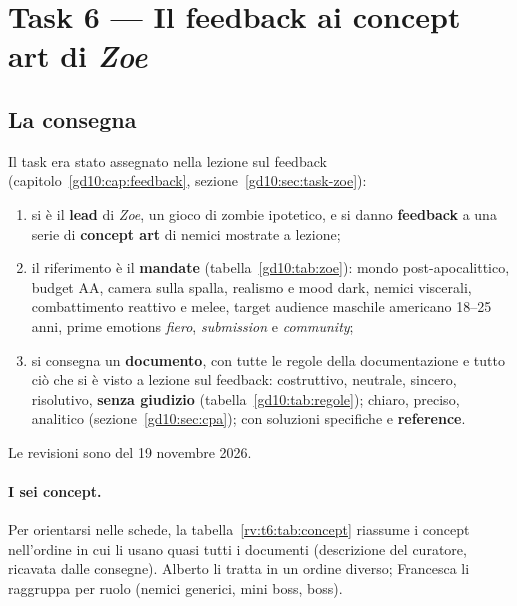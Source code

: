 \section{Task 6 --- Il feedback ai concept art di \emph{Zoe}}
\label{rv:t6:sec:task}

\subsection{La consegna}

Il task era stato assegnato nella lezione sul feedback
(capitolo~\ref{gd10:cap:feedback}, sezione~\ref{gd10:sec:task-zoe}):
\begin{enumerate}
  \item si è il \textbf{lead} di \emph{Zoe}, un gioco di zombie ipotetico, e
        si danno \textbf{feedback} a una serie di \textbf{concept art} di
        nemici mostrate a lezione;
  \item il riferimento è il \textbf{mandate} (tabella~\ref{gd10:tab:zoe}):
        mondo post-apocalittico, budget AA, camera sulla spalla, realismo e
        mood dark, nemici viscerali, combattimento reattivo e melee, target
        audience maschile americano 18--25 anni, prime emotions
        \emph{fiero}, \emph{submission} e \emph{community};
  \item si consegna un \textbf{documento}, con tutte le regole della
        documentazione e tutto ciò che si è visto a lezione sul feedback:
        costruttivo, neutrale, sincero, risolutivo, \textbf{senza giudizio}
        (tabella~\ref{gd10:tab:regole}); chiaro, preciso, analitico
        (sezione~\ref{gd10:sec:cpa}); con soluzioni specifiche e
        \textbf{reference}.
\end{enumerate}
Le revisioni sono del 19 novembre 2026.

\paragraph{I sei concept.} Per orientarsi nelle schede, la
tabella~\ref{rv:t6:tab:concept} riassume i concept nell'ordine in cui li
usano quasi tutti i documenti (descrizione del curatore, ricavata dalle
consegne). Alberto li tratta in un ordine diverso; Francesca li raggruppa per
ruolo (nemici generici, mini boss, boss).

